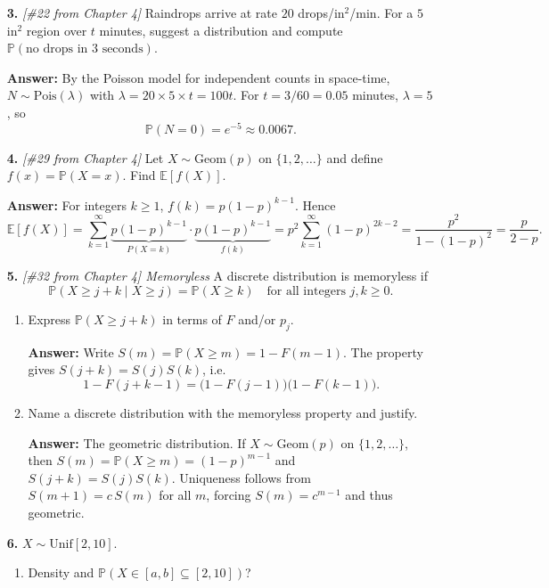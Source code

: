 \documentclass[11pt]{article}
\begin{document}
\begin{enumerate}
\item[\textbf{3.}] \emph{[\#22 from Chapter 4]}
Raindrops arrive at rate $20$ drops/in$^2$/min. For a $5$ in$^2$ region over $t$ minutes, suggest a distribution and compute $\mathbb{P}(\text{no drops in }3\text{ seconds})$.

\textbf{Answer:} By the Poisson model for independent counts in space-time, $N \sim \mathrm{Pois}(\lambda)$ with $\lambda=20\times 5 \times t = 100t$. For $t=3/60=0.05$ minutes, $\lambda=5$, so
\[
\mathbb{P}(N=0)=e^{-5}\approx 0.0067.
\]

\item[\textbf{4.}] \emph{[\#29 from Chapter 4]}
Let $X \sim \mathrm{Geom}(p)$ on $\{1,2,\dots\}$ and define $f(x)=\mathbb{P}(X=x)$. Find $\mathbb{E}[f(X)]$.

\textbf{Answer:} For integers $k\ge 1$, $f(k)=p(1-p)^{k-1}$. Hence
\[
\mathbb{E}[f(X)]
= \sum_{k=1}^{\infty} \underbrace{p(1-p)^{k-1}}_{P(X=k)} \cdot \underbrace{p(1-p)^{k-1}}_{f(k)}
= p^2 \sum_{k=1}^{\infty} (1-p)^{2k-2}
= \frac{p^2}{1-(1-p)^2}
= \frac{p}{2-p}.
\]

\item[\textbf{5.}] \emph{[\#32 from Chapter 4] Memoryless} A discrete distribution is memoryless if
\[
\mathbb{P}(X\ge j+k \mid X\ge j)=\mathbb{P}(X\ge k)\quad\text{for all integers } j,k\ge 0.
\]

\begin{enumerate}[label=(\alph*)]
\item Express $\mathbb{P}(X\ge j+k)$ in terms of $F$ and/or $p_j$.

\textbf{Answer:} Write $S(m)=\mathbb{P}(X\ge m)=1-F(m-1)$. The property gives $S(j+k)=S(j)S(k)$, i.e.
\[
1-F(j+k-1)=\bigl(1-F(j-1)\bigr)\bigl(1-F(k-1)\bigr).
\]

\item Name a discrete distribution with the memoryless property and justify.

\textbf{Answer:} The geometric distribution. If $X \sim \mathrm{Geom}(p)$ on $\{1,2,\dots\}$, then
$S(m)=\mathbb{P}(X\ge m)=(1-p)^{m-1}$ and $S(j+k)=S(j)S(k)$. Uniqueness follows from $S(m+1)=c\,S(m)$ for all $m$,
forcing $S(m)=c^{m-1}$ and thus geometric.
\end{enumerate}

\item[\textbf{6.}] $X \sim \mathrm{Unif}[2,10]$.

\begin{enumerate}[label=(\alph*)]
\item Density and $\mathbb{P}(X\in [a,b]\subseteq[2,10])$?


\end{enumerate}
\end{enumerate}
\end{document}
